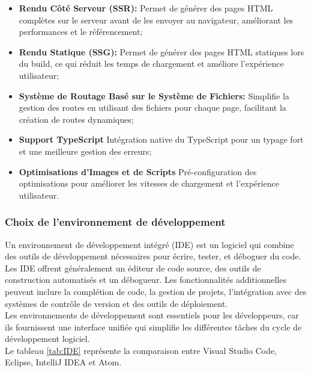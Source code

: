 \documentclass[12pt]{report}
\begin{document}
				 \begin{itemize}
					\item \textbf{Rendu Côté Serveur (SSR):} Permet de générer des pages HTML complètes sur le serveur avant de les envoyer au navigateur, améliorant les performances et le référencement;
					\item \textbf{Rendu Statique (SSG):} Permet de générer des pages HTML statiques lors du build, ce qui réduit les temps de chargement et améliore l'expérience utilisateur;
					\item \textbf{Système de Routage Basé sur le Système de Fichiers:} Simplifie la gestion des routes en utilisant des fichiers pour chaque page, facilitant la création de routes dynamiques;
					\item \textbf{Support TypeScript} Intégration native du TypeScript pour un typage fort et une meilleure gestion des erreurs;
					\item \textbf{Optimisations d'Images et de Scripts} Pré-configuration des optimisations pour améliorer les vitesses de chargement et l'expérience utilisateur.
				\end{itemize}


				\subsubsection{Choix de l’environnement de développement}
				
				\hspace{15pt} Un environnement de développement intégré (IDE) est un logiciel qui combine des outils de développement nécessaires pour écrire, tester, et déboguer du code. Les IDE offrent généralement un éditeur de code source, des outils de construction automatisés et un débogueur. Les fonctionnalités additionnelles peuvent inclure la complétion de code, la gestion de projets, l’intégration avec des systèmes de contrôle de version et des outils de déploiement.\\

				Les environnements de développement sont essentiels pour les développeurs, car ils fournissent une interface unifiée qui simplifie les différentes tâches du cycle de développement logiciel.\\

				Le tableau \ref{tab:IDE} représente la comparaison entre Visual Studio Code, Eclipse, IntelliJ IDEA et Atom.
				
\end{document}
